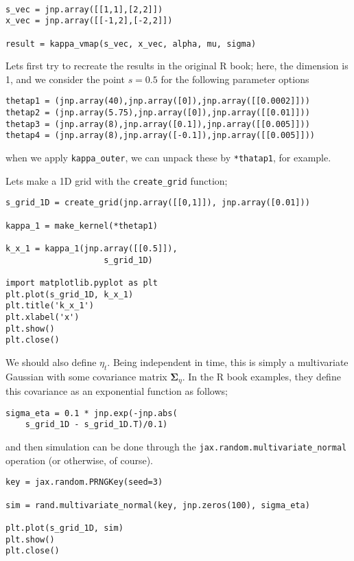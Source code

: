 \documentclass[letterpaper]{article}
\newcommand*{\mat}[1]{\bm{#1}}
\begin{document}
\begin{verbatim}

s_vec = jnp.array([[1,1],[2,2]])
x_vec = jnp.array([[-1,2],[-2,2]])

result = kappa_vmap(s_vec, x_vec, alpha, mu, sigma)
\end{verbatim}

Lets first try to recreate the results in the original R book; here, the dimension is 1, and we consider the point \(s=0.5\) for the following parameter options

\begin{verbatim}
thetap1 = (jnp.array(40),jnp.array([0]),jnp.array([[0.0002]]))
thetap2 = (jnp.array(5.75),jnp.array([0]),jnp.array([[0.01]]))
thetap3 = (jnp.array(8),jnp.array([0.1]),jnp.array([[0.005]]))
thetap4 = (jnp.array(8),jnp.array([-0.1]),jnp.array([[0.005]]))
\end{verbatim}

when we apply \texttt{kappa\_outer}, we can unpack these by \texttt{*thatap1}, for example.

Lets make a 1D grid with the \texttt{create\_grid} function;

\begin{verbatim}
s_grid_1D = create_grid(jnp.array([[0,1]]), jnp.array([0.01]))

kappa_1 = make_kernel(*thetap1)

k_x_1 = kappa_1(jnp.array([[0.5]]),
                    s_grid_1D)

import matplotlib.pyplot as plt
plt.plot(s_grid_1D, k_x_1)
plt.title('k_x_1')
plt.xlabel('x')
plt.show()
plt.close()
\end{verbatim}

We should also define \(\eta_t\). Being independent in time, this is simply a multivariate Gaussian with some covariance matrix \(\mat \Sigma_{\eta}\). In the R book examples, they define this covariance as an exponential function as follows;

\begin{verbatim}
sigma_eta = 0.1 * jnp.exp(-jnp.abs(
    s_grid_1D - s_grid_1D.T)/0.1)
\end{verbatim}

and then simulation can be done through the \texttt{jax.random.multivariate\_normal} operation (or otherwise, of course).

\begin{verbatim}
key = jax.random.PRNGKey(seed=3)

sim = rand.multivariate_normal(key, jnp.zeros(100), sigma_eta)

plt.plot(s_grid_1D, sim)
plt.show()
plt.close()
\end{verbatim}
\end{document}
